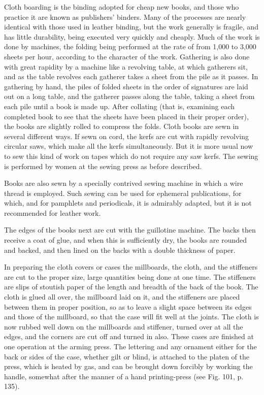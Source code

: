 \documentclass[twoside]{book}
\begin{document}
Cloth boarding is the binding adopted for cheap
new books, and those who practice it are known as
publishers' binders. Many of the processes are
nearly identical with those used in leather binding,
but the work generally is fragile, and has little
durability, being executed very quickly and cheaply.
\pagebreak
Much of the work is done by machines, the folding
being performed at the rate of from 1,000 to 3,000
sheets per hour, according to the character of the
work. Gathering is also done with great rapidity
by a machine like a revolving table, at which
gatherers sit, and as the table revolves each
gatherer takes a sheet from the pile as it passes.
In gathering by hand, the piles of folded sheets
in the order of signatures are laid out on a long
table, and the gatherer passes along the table,
taking a sheet from each pile until a book is made
up. After collating (that is, examining each completed
book to see that the sheets have been placed
in their proper order), the books are slightly rolled
to compress the folds. Cloth books are sewn in
several different ways. If sewn on cord, the kerfs
are cut with rapidly revolving circular saws, which
make all the kerfs simultaneously. But it is more
usual now to sew this kind of work on tapes which
do not require any saw kerfs. The sewing is performed
by women at the sewing press as before described.

Books are also sewn by a specially contrived
sewing machine in which a wire thread is
employed. Such sewing can be used for ephemeral
publications, for which, and for pamphlets and
periodicals, it is admirably adapted, but it is not
recommended for leather work.

The edges of the books next are cut with the
guillotine machine. The backs then receive a coat
of glue, and when this is sufficiently dry, the books
are rounded and backed, and then lined on the
backs with a double thickness of paper.

In preparing the cloth covers or cases the millboards,
the cloth, and the stiffeners are cut to the
proper size, large quantities being done at one time.
The stiffeners are slips of stoutish paper of the
length and breadth of the back of the book. The
cloth is glued all over, the millboard laid on it,
and the stiffeners are placed between them in proper
\pagebreak
position, so as to leave a slight space between its
edges and those of the millboard, so that the case
will fit well at the joints. The cloth is now rubbed
well down on the millboards and stiffener, turned
over at all the edges, and the corners are cut off
and turned in also. These cases are finished at one
operation at the arming press. The lettering and
any ornament either for the back or sides of the
case, whether gilt or blind, is attached to the platen
of the press, which is heated by gas, and can be
brought down forcibly by working the handle, somewhat
after the manner of a hand printing-press (see Fig.
101, p. 135).
\end{document}
